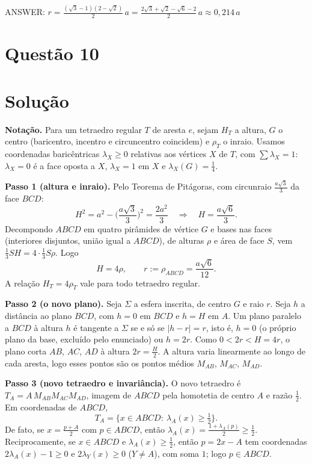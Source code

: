 \documentclass{article}%
\begin{document}
ANSWER: $r=\frac{(\sqrt{3}-1)(2-\sqrt{2})}{2}\,a=\frac{2\sqrt{3}+\sqrt{2}-\sqrt{6}-2}{2}\,a\approx 0{,}214\,a$%
\newpage%
\section*{Questão 10}

\section*{Solução}

\textbf{Notação.} Para um tetraedro regular $T$ de aresta $e$, sejam $H_T$ a altura, $G$ o centro (baricentro, incentro e circuncentro coincidem) e $\rho_T$ o inraio. Usamos coordenadas baricêntricas $\lambda_X\ge 0$ relativas aos vértices $X$ de $T$, com $\sum\lambda_X=1$: $\lambda_X=0$ é a face oposta a $X$, $\lambda_X=1$ em $X$ e $\lambda_X(G)=\frac14$.

\textbf{Passo 1 (altura e inraio).} Pelo Teorema de Pitágoras, com circunraio $\frac{a\sqrt3}{3}$ da face $BCD$:
\[
H^2=a^2-\Big(\frac{a\sqrt3}{3}\Big)^2=\frac{2a^2}{3}\quad\Rightarrow\quad H=\frac{a\sqrt6}{3}.
\]
Decompondo $ABCD$ em quatro pirâmides de vértice $G$ e bases nas faces (interiores disjuntos, união igual a $ABCD$), de alturas $\rho$ e área de face $S$, vem $\frac13SH=4\cdot\frac13S\rho$. Logo
\[
H=4\rho,\qquad r:=\rho_{ABCD}=\frac{a\sqrt6}{12}.
\]
A relação $H_T=4\rho_T$ vale para todo tetraedro regular.

\textbf{Passo 2 (o novo plano).} Seja $\Sigma$ a esfera inscrita, de centro $G$ e raio $r$. Seja $h$ a distância ao plano $BCD$, com $h=0$ em $BCD$ e $h=H$ em $A$. Um plano paralelo a $BCD$ à altura $h$ é tangente a $\Sigma$ se e só se $|h-r|=r$, isto é, $h=0$ (o próprio plano da base, excluído pelo enunciado) ou $h=2r$. Como $0<2r<H=4r$, o plano corta $AB$, $AC$, $AD$ à altura $2r=\frac H2$. A altura varia linearmente ao longo de cada aresta, logo esses pontos são os pontos médios $M_{AB}$, $M_{AC}$, $M_{AD}$.

\textbf{Passo 3 (novo tetraedro e invariância).} O novo tetraedro é $T_A=A\,M_{AB}M_{AC}M_{AD}$, imagem de $ABCD$ pela homotetia de centro $A$ e razão $\frac12$. Em coordenadas de $ABCD$,
\[
T_A=\{x\in ABCD:\ \lambda_A(x)\ge\tfrac12\}.
\]
De fato, se $x=\frac{p+A}{2}$ com $p\in ABCD$, então $\lambda_A(x)=\frac{1+\lambda_A(p)}{2}\ge\frac12$. Reciprocamente, se $x\in ABCD$ e $\lambda_A(x)\ge\frac12$, então $p=2x-A$ tem coordenadas $2\lambda_A(x)-1\ge0$ e $2\lambda_Y(x)\ge0$ ($Y\ne A$), com soma $1$; logo $p\in ABCD$.
\end{document}
